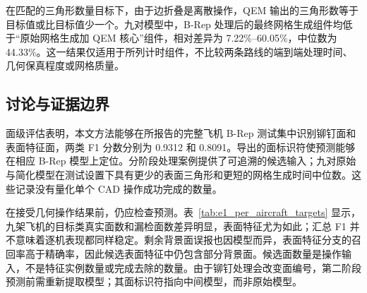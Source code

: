 \documentclass[12pt,a4paper]{ctexart}
\begin{document}
\begin{table}[!ht]
\centering
\caption{与 QEM 进行匹配三角形规模的计时组件比较。基线为原始 B-Rep 网格生成加 QEM 核心运行，本文组件为几何处理后的最终网格生成。相对差异根据未四舍五入的时间计算。}\label{tab:qem_matched_time}
\end{table}
\FloatBarrier

在匹配的三角形数量目标下，由于边折叠是离散操作，QEM 输出的三角形数等于目标值或比目标值少一个。九对模型中，B-Rep 处理后的最终网格生成组件均低于“原始网格生成加 QEM 核心”组件，相对差异为 7.22\%--60.05\%，中位数为 44.33\%。这一结果仅适用于所列计时组件，不比较两条路线的端到端处理时间、几何保真程度或网格质量。

\subsection{讨论与证据边界}\label{sec:experimental_boundaries}

面级评估表明，本文方法能够在所报告的完整飞机 B-Rep 测试集中识别铆钉面和表面特征面，两类 F1 分数分别为 0.9312 和 0.8091。导出的面标识符使预测能够在相应 B-Rep 模型上定位。分阶段处理案例提供了可追溯的候选输入；九对原始与简化模型在测试设置下具有更少的表面三角形和更短的网格生成时间中位数。这些记录没有量化单个 CAD 操作成功完成的数量。

在接受几何操作结果前，仍应检查预测。表~\ref{tab:e1_per_aircraft_targets} 显示，九架飞机的目标类真实面数和漏检面数差异明显，表面特征尤为如此；汇总 F1 并不意味着逐机表现都同样稳定。剩余背景面误报也因模型而异，表面特征分支的召回率高于精确率，因此候选表面特征中仍包含部分背景面。候选面数量是操作输入，不是特征实例数量或完成去除的数量。由于铆钉处理会改变面编号，第二阶段预测前需重新提取模型；其面标识符指向中间模型，而非原始模型。
\end{document}
